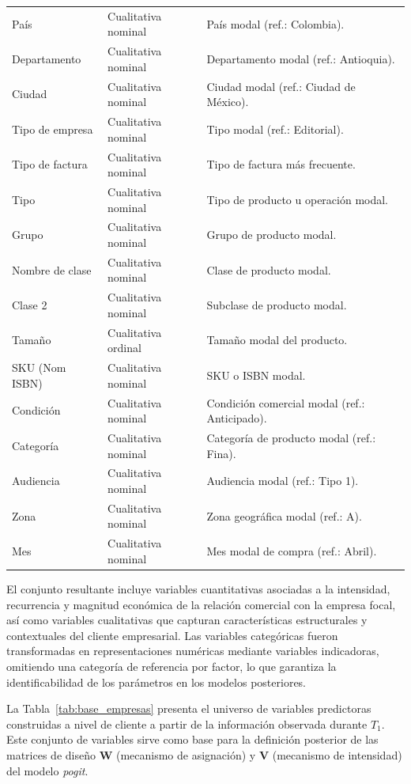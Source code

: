 \begin{table}[H]
{\begin{tabular}{lll}
    País & Cualitativa nominal & País modal (ref.: Colombia). \\
    Departamento & Cualitativa nominal & Departamento modal (ref.: Antioquia). \\
    Ciudad & Cualitativa nominal & Ciudad modal (ref.: Ciudad de México). \\
    Tipo de empresa & Cualitativa nominal & Tipo modal (ref.: Editorial). \\
    Tipo de factura & Cualitativa nominal & Tipo de factura más frecuente. \\
    Tipo & Cualitativa nominal & Tipo de producto u operación modal. \\
    Grupo & Cualitativa nominal & Grupo de producto modal. \\
    Nombre de clase & Cualitativa nominal & Clase de producto modal. \\
    Clase 2 & Cualitativa nominal & Subclase de producto modal. \\
    Tamaño & Cualitativa ordinal & Tamaño modal del producto. \\
    SKU (Nom ISBN) & Cualitativa nominal & SKU o ISBN modal. \\
    Condición & Cualitativa nominal & Condición comercial modal (ref.: Anticipado). \\
    Categoría & Cualitativa nominal & Categoría de producto modal (ref.: Fina). \\
    Audiencia & Cualitativa nominal & Audiencia modal (ref.: Tipo 1). \\
    Zona & Cualitativa nominal & Zona geográfica modal (ref.: A). \\
    Mes & Cualitativa nominal & Mes modal de compra (ref.: Abril). \\
    \hline
    \end{tabular}
    }
    \end{table}

    El conjunto resultante incluye variables cuantitativas asociadas a la intensidad, recurrencia y magnitud económica de la relación comercial con la empresa focal, así como variables cualitativas que capturan características estructurales y contextuales del cliente empresarial. Las variables categóricas fueron transformadas en representaciones numéricas mediante variables indicadoras, omitiendo una categoría de referencia por factor, lo que garantiza la identificabilidad de los parámetros en los modelos posteriores.
    
    La Tabla~\ref{tab:base_empresas} presenta el universo de variables predictoras construidas a nivel de cliente a partir de la información observada durante \(T_1\). Este conjunto de variables sirve como base para la definición posterior de las matrices de diseño \(\mathbf{W}\) (mecanismo de asignación) y \(\mathbf{V}\) (mecanismo de intensidad) del modelo \emph{pogit}. 
    
